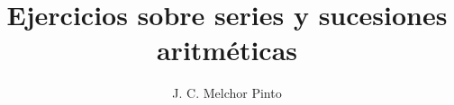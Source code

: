 \documentclass[12pt]{guia}
\title{Ejercicios sobre series y sucesiones aritméticas}
\author{J. C. Melchor Pinto}
\begin{document}
\pagestyle{headandfoot}
\addpoints
\INFO
\printanswers
\begin{questions}
    
    
    
    
    
    
    
    
    
    
    
    
    
    
    
    
\end{questions}

\end{document}
